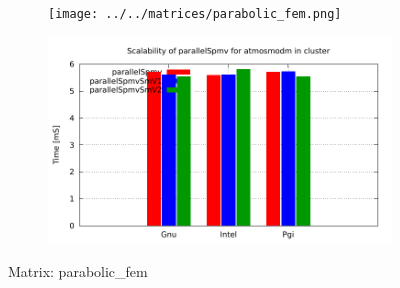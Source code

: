 \begin{figure} [ht!]
    \centering
    \captionsetup{justification=centering, singlelinecheck=false}
    \begin{subfigure}{.65\textwidth}
      \centering
      \hspace*{-3.5cm} 
      \texttt{[image: ../../matrices/parabolic\_fem.png]}
      \label{fig:parabolic_fem_matrix}
    \end{subfigure}%
    \begin{subfigure}{.65\textwidth}
      \centering
      \hspace*{-6.0cm} 
      \includegraphics[page=4, width=0.95\linewidth]{../plots/myCluster_4-2.pdf}
      \label{fig:parabolic_fem_performance}
    \end{subfigure}
\caption{Matrix: parabolic\_fem}
\label{fig:parabolic_fem}
\end{figure}

